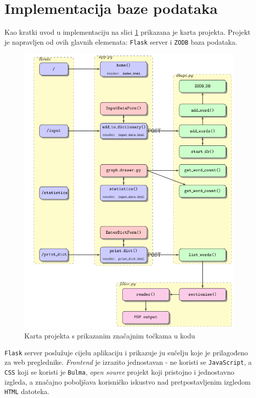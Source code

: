 \documentclass{foi}
\begin{document}
\section{Implementacija baze podataka}

Kao kratki uvod u implementaciju na slici \ref{project_diagram} prikazana je
karta projekta. Projekt je napravljen od ovih glavnih elemenata:
\texttt{Flask} server i \texttt{ZODB} baza podataka.

\begin{figure}
	\centering
	\includegraphics{project_diagram.pdf}
	\caption{Karta projekta s prikazanim značajnim točkama u kodu}
	\label{project_diagram}
\end{figure}

\texttt{Flask} server poslužuje cijelu aplikaciju i prikazuje ju sučelju koje
je prilagođeno za web preglednike. \textit{Frontend} je izrazito jednostavan -
ne koristi se \texttt{JavaScript}, a \texttt{CSS} koji se koristi je
\texttt{Bulma}, \textit{open source} projekt koji pristojno i jednostavno
izgleda, a značajno poboljšava korisničko iskustvo nad pretpostavljenim
izgledom \texttt{HTML} datoteka.
\end{document}

